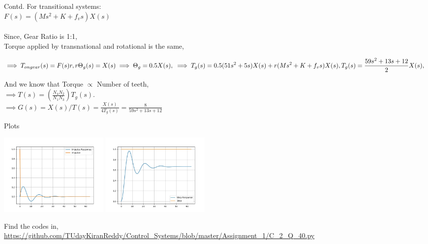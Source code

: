 \documentclass{beamer}
\numberwithin{equation}{section}
\begin{document}
\begin{frame}{Contd.}
For transitional systems:\\
$F(s) = (Ms^2 + K + f_vs)X(s)$\\\\
Since, Gear Ratio is 1:1,\\
Torque applied by transnational and rotational is the same,
    \begin{center}
        \begin{equation*}
            \implies T_{on gear}(s) = F(s)r,\\
            r\Theta_g(s) = X(s) \implies \Theta_g = 0.5X(s),\\\\
            \implies T_g(s) = 0.5(51s^2 + 5s)X(s) + r(Ms^2 + K + f_vs)X(s),\\\\
            T_g(s) = \frac{59s^2 + 13s + 12}{2}X(s),\\
        \end{equation*}
    \end{center}
And we know that Torque $\propto$ Number of teeth,\\
$\implies T(s) = (\frac{N_4N_2}{N_1N_3})T_g(s)$.\\
$\implies G(s) = X(s)/T(s) = \frac{X(s)}{4T_g(s)} = \frac{8}{59s^2 + 13s + 12}$\\
\end{frame}

\begin{frame}{Plots}

     \begin{center}
         \includegraphics[height = 4cm]{./figs/Impulse Response.jpg}
         \includegraphics[height = 4cm]{./figs/Step Response.jpg}
     \end{center}
     Find the codes in,\\

        \url{https://github.com/TUdayKiranReddy/Control_Systems/blob/master/Assignment_1/C_2_Q_40.py}

\end{frame}
\end{document}

